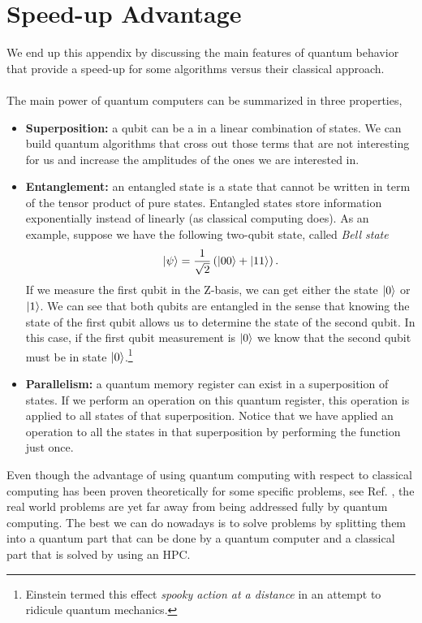 \section{Speed-up Advantage}
We end up this appendix by discussing the main features of quantum behavior that provide a speed-up for some algorithms versus their classical approach.\\\\
The main power of quantum computers can be summarized in three properties,
\begin{itemize}
    \item \textbf{Superposition:} a qubit can be a in a linear combination of states. We can build quantum algorithms that cross out those terms that are not interesting for us and increase the amplitudes of the ones we are interested in.
    \item \textbf{Entanglement:} an entangled state is a state that cannot be written in term of the tensor product of pure states. Entangled states store information exponentially instead of linearly (as classical computing does). As an example, suppose we have the following two-qubit state, called \textit{Bell state}
\begin{equation}
    \ket{\psi} = \frac{1}{\sqrt{2}}\left(\ket{00} + \ket{11}\right).
\end{equation}
If we measure the first qubit in the Z-basis, we can get either the state $\ket{0}$ or $\ket{1}$. We can see that both qubits are entangled in the sense that knowing the state of the first qubit allows us to determine the state of the second qubit. In this case, if the first qubit measurement is $\ket{0}$ we know that the second qubit must be in state $\ket{0}$.\footnote{Einstein termed this effect \emph{spooky action at a distance} in an attempt to ridicule quantum mechanics.}  
    \item \textbf{Parallelism:} a quantum memory register can exist in a superposition of states. If we perform an operation on this quantum register, this operation is applied to all states of that superposition. Notice that we have applied an operation to all the states in that superposition by performing the function just once.
\end{itemize}
Even though the advantage of using quantum computing with respect to classical computing has been proven theoretically for some specific problems, see Ref. \cite{Grover19961996Search}, the real world problems are yet far away from being addressed fully by quantum computing. The best we can do nowadays is to solve problems by splitting them into a quantum part that can be done by a quantum computer and a classical part that is solved by using an HPC.

